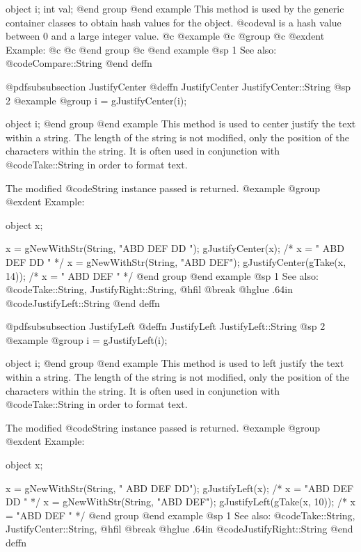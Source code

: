 object  i;
int     val;
@end group
@end example
This method is used by the generic container classes to obtain hash
values for the object.  @code{val} is a hash value between 0 and a large
integer value.
@c @example
@c @group
@c @exdent Example:
@c
@c @end group
@c @end example
@sp 1
See also:  @code{Compare::String}
@end deffn








@pdfsubsubsection {JustifyCenter}
@deffn {JustifyCenter} JustifyCenter::String
@sp 2
@example
@group
i = gJustifyCenter(i);

object  i;
@end group
@end example
This method is used to center justify the text within a string.  The length
of the string is not modified, only the position of the characters within
the string.  It is often used in conjunction with @code{Take::String} in
order to format text.

The modified @code{String} instance passed is returned.
@example
@group
@exdent Example:

object  x;

x = gNewWithStr(String, "ABD  DEF  DD      ");
gJustifyCenter(x);   /*  x = "   ABD  DEF  DD   "    */
x = gNewWithStr(String, "ABD  DEF");
gJustifyCenter(gTake(x, 14));   /*  x = "   ABD  DEF   "    */
@end group
@end example
@sp 1
See also:  @code{Take::String, JustifyRight::String,}
@hfil @break @hglue .64in       @code{JustifyLeft::String}
@end deffn






@pdfsubsubsection {JustifyLeft}
@deffn {JustifyLeft} JustifyLeft::String
@sp 2
@example
@group
i = gJustifyLeft(i);

object  i;
@end group
@end example
This method is used to left justify the text within a string.  The length
of the string is not modified, only the position of the characters within
the string.  It is often used in conjunction with @code{Take::String} in
order to format text.

The modified @code{String} instance passed is returned.
@example
@group
@exdent Example:

object  x;

x = gNewWithStr(String, "    ABD  DEF  DD");
gJustifyLeft(x);   /*  x = "ABD  DEF  DD    "    */
x = gNewWithStr(String, "ABD  DEF");
gJustifyLeft(gTake(x, 10));   /*  x = "ABD  DEF  "    */
@end group
@end example
@sp 1
See also:  @code{Take::String, JustifyCenter::String,}
@hfil @break @hglue .64in       @code{JustifyRight::String}
@end deffn











